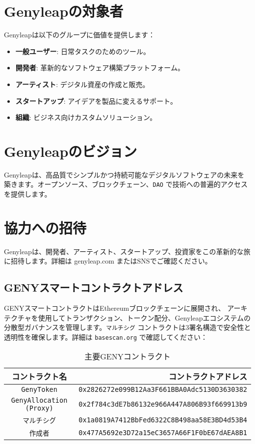 \documentclass[a4paper,12pt,openany]{book}
\begin{document}
\chapter{Genyleapの対象者}
Genyleapは以下のグループに価値を提供します：
\begin{itemize}
    \item \textbf{一般ユーザー}: 日常タスクのためのツール。
    \item \textbf{開発者}: 革新的なソフトウェア構築プラットフォーム。
    \item \textbf{アーティスト}: デジタル資産の作成と販売。
    \item \textbf{スタートアップ}: アイデアを製品に変えるサポート。
    \item \textbf{組織}: ビジネス向けカスタムソリューション。
\end{itemize}

\chapter{Genyleapのビジョン}
Genyleapは、高品質でシンプルかつ持続可能なデジタルソフトウェアの未来を築きます。オープンソース、ブロックチェーン、\texttt{DAO} で技術への普遍的アクセスを提供します。

\chapter{協力への招待}
Genyleapは、開発者、アーティスト、スタートアップ、投資家をこの革新的な旅に招待します。詳細は genyleap.com またはSNSでご確認ください。

\section*{GENYスマートコントラクトアドレス}
GENYスマートコントラクトはEthereumブロックチェーンに展開され、 アーキテクチャを使用してトランザクション、トークン配分、Genyleapエコシステムの分散型ガバナンスを管理します。\texttt{マルチシグ} コントラクトは3署名構造で安全性と透明性を確保します。詳細は \texttt{basescan.org} で確認してください：

\begin{table}[h]
\centering
\caption*{主要GENYコントラクト}
\small
\begin{tabular}{c r}
\hline
\textbf{コントラクト名} & \textbf{コントラクトアドレス} \\
\hline
\texttt{GenyToken} & {\texttt{0x2826272e099B12Aa3F661BBA0Adc5130D3630382}} \\
\texttt{GenyAllocation (Proxy)} & {\texttt{0x2f784c3dE7b86132e966A447A806B93f669913b9}} \\
\texttt{マルチシグ} & {\texttt{0x1a0819A7412BbFed6322C8B498aa58E3BD4d53B4}} \\
\texttt{作成者} & {\texttt{0x477A5692e3D72a15eC3657A66F1F0bE67dAEA8B1}} \\
\hline
\end{tabular}
\end{table}
\end{document}
